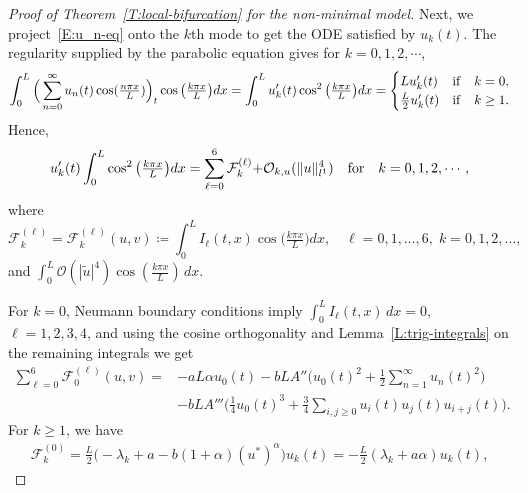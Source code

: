 \documentclass[11pt]{article} %
\theoremstyle{remark}
\theoremstyle{remark}
\numberwithin{equation}{section}
\numberwithin{figure}{section}
\numberwithin{table}{section}
\begin{document}
\begin{proof}[Proof of Theorem~\ref{T:local-bifurcation}  for the non-minimal model]
  Next, we project~\eqref{E:u_n-eq} onto the $k$th mode to get the ODE
  satisfied by $u_k(t)$. The regularity supplied by the parabolic equation gives
  for $k = 0, 1, 2, \cdots$,
  \begin{gather*}
    \int_0^{{L}}   \Big(\sum_{n=0}^\infty u_n(t)\cos(\tfrac{n\pi x}{L})\Big)_t   \cos\big(\tfrac{k\pi x}{L}\big)dx= \int_0^L u_k'(t)
    \cos^2\big(\tfrac{k\pi x}{L}\big)dx =
    \begin{cases}
      L u_k'(t)            & {\rm if}\quad k=0, \\
      \tfrac{L}{2} u_k'(t) & {\rm if}\quad k\ge 1.
    \end{cases}
  \end{gather*}
  Hence,
  \begin{equation}\label{E:ode-eq0}
    u'_k(t)\int_0^L \cos^2\big(\tfrac{k\pi x}{L}\big)dx=\sum_{\ell=0}^6
    \mathcal{F}_k^{(\ell)} {+\mathcal{O}_{k,u}(\|u\|_{l^1}^4)}\quad {\rm for}\quad k=0,1,2,\cdots,
  \end{equation}
  where
  \begin{equation}\label{E:Fk-projection}
    \mathcal{F}_k^{(\ell)} = \mathcal{F}_k^{(\ell)}(u,v) \coloneqq \int_0^L
    I_{\ell}(t,x) \cos\big(\tfrac{k\pi x}{L}\big) dx, \quad \ell =
    0,1,\ldots,6,\; k = 0,1,2,\dots,
  \end{equation}
  { and  $\int_0^L\mathcal{O}(|\tilde{u}|^4)\cos\left(\tfrac{k\pi
  x}{L}\right)\,dx$.}

  For $k = 0$, Neumann boundary conditions imply $\int_0^L I_\ell(t, x)\,dx =
  0$, $\ell = 1, 2, 3, 4$, and using the cosine orthogonality and
  Lemma~\ref{L:trig-integrals} on the remaining integrals we get
  \begin{align*}
    \sum_{\ell=0}^{6} \mathcal{F}_0^{(\ell)}(u,v)
    =      & {-aL\alpha u_0(t)}
    - b L A''
    \Big(
    u_0(t)^2 + \frac{1}{2}\sum_{n=1}^\infty u_n(t)^2
    \Big) \\
    & - b L A'''
    \Big(
    \frac{1}{4}u_0(t)^3
    + \frac{3}{4}\sum_{i,j\ge0} u_i(t)u_j(t)u_{i+j}(t)
    \Big).
  \end{align*}
  For $k \ge 1$, we have
  \begin{align*}
    \mathcal{F}_k^{(0)}
    =
    \frac{L}{2}\Big(-\lambda_k + a - b(1+\alpha)(u^*)^\alpha\Big)
    u_k(t){=-{\frac{L}{2}}(\lambda_k+a\alpha)u_k(t),}
  \end{align*}


\end{proof}
\end{document}
